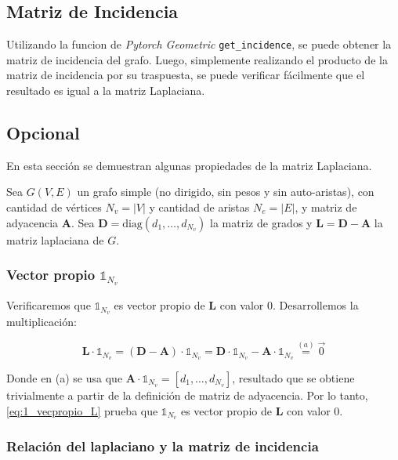 \documentclass{article}
\begin{document}
\subsection{Matriz de Incidencia}
Utilizando la funcion de \textit{Pytorch Geometric} \verb|get_incidence|, se puede obtener la matriz de incidencia del grafo. Luego, simplemente realizando el producto de la matriz de incidencia por su traspuesta, se puede verificar fácilmente que el resultado es igual a la matriz Laplaciana.

\subsection{Opcional} \label{subsec:opcional}
En esta sección se demuestran algunas propiedades de la matriz Laplaciana.

\newcommand{\ones}[1]{\mathbb{1}_{#1}}
\newcommand{\lap}{\mathbf{L}}
\newcommand{\diag}{\mathbf{D}}
\newcommand{\adj}{\mathbf{A}}
\newcommand{\bm}{\tilde{\mathbf{B}}}
\newcommand{\x}{\mathbf{x}}

Sea $G(V,E)$ un grafo simple (no dirigido, sin pesos y sin auto-aristas), con cantidad de vértices $N_v = |V|$ y cantidad de aristas $N_e = |E|$, y matriz de adyacencia $\mathbf{A}$. Sea $\mathbf{D} = \text{diag}(d_{1},\dots, d_{N_v})$ la matriz de grados y $\mathbf{L}=\mathbf{D}- \mathbf{A}$ la matriz laplaciana de $G$.

\subsubsection{Vector propio $\ones{N_v}$}
\label{subsec:vector_propio_1}

Verificaremos que $\ones{N_v}$ es vector propio de $\lap$ con valor 0. Desarrollemos la multiplicación:

\begin{equation}
    \lap \cdot \ones{N_v} = (\diag - \adj) \cdot \ones{N_v}  = \diag \cdot \ones{N_v} - \adj \cdot \ones{N_v} \stackrel{(a)}{=} \vec{0}
    \label{eq:1_vecpropio_L}
\end{equation}

Donde en (a) se usa que $\adj \cdot \ones{N_v} = [d_1, \dots, d_{N_v}]$, resultado que
se obtiene trivialmente a partir de la definición de matriz de adyacencia.
Por lo tanto, \eqref{eq:1_vecpropio_L} prueba que $\ones{N_v}$ es vector propio de $\lap$ con valor 0.

\subsubsection{Relación del laplaciano y la matriz de incidencia}
\end{document}
